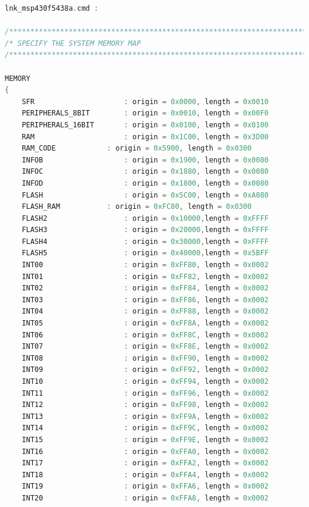 \documentclass[LaM,binding=0.6cm]{../sapthesis}
\begin{document}
\begin{lstlisting}[language=C]
    lnk_msp430f5438a.cmd :
    
/****************************************************************************/
/* SPECIFY THE SYSTEM MEMORY MAP                                            */
/****************************************************************************/

MEMORY
{
    SFR                     : origin = 0x0000, length = 0x0010
    PERIPHERALS_8BIT        : origin = 0x0010, length = 0x00F0
    PERIPHERALS_16BIT       : origin = 0x0100, length = 0x0100
    RAM                     : origin = 0x1C00, length = 0x3D00	
    RAM_CODE		    : origin = 0x5900, length = 0x0300
    INFOB                   : origin = 0x1900, length = 0x0080
    INFOC                   : origin = 0x1880, length = 0x0080
    INFOD                   : origin = 0x1800, length = 0x0080
    FLASH                   : origin = 0x5C00, length = 0xA080	
    FLASH_RAM		    : origin = 0xFC80, length = 0x0300
    FLASH2                  : origin = 0x10000,length = 0xFFFF
    FLASH3                  : origin = 0x20000,length = 0xFFFF
    FLASH4                  : origin = 0x30000,length = 0xFFFF
    FLASH5                  : origin = 0x40000,length = 0x5BFF
    INT00                   : origin = 0xFF80, length = 0x0002
    INT01                   : origin = 0xFF82, length = 0x0002
    INT02                   : origin = 0xFF84, length = 0x0002
    INT03                   : origin = 0xFF86, length = 0x0002
    INT04                   : origin = 0xFF88, length = 0x0002
    INT05                   : origin = 0xFF8A, length = 0x0002
    INT06                   : origin = 0xFF8C, length = 0x0002
    INT07                   : origin = 0xFF8E, length = 0x0002
    INT08                   : origin = 0xFF90, length = 0x0002
    INT09                   : origin = 0xFF92, length = 0x0002
    INT10                   : origin = 0xFF94, length = 0x0002
    INT11                   : origin = 0xFF96, length = 0x0002
    INT12                   : origin = 0xFF98, length = 0x0002
    INT13                   : origin = 0xFF9A, length = 0x0002
    INT14                   : origin = 0xFF9C, length = 0x0002
    INT15                   : origin = 0xFF9E, length = 0x0002
    INT16                   : origin = 0xFFA0, length = 0x0002
    INT17                   : origin = 0xFFA2, length = 0x0002
    INT18                   : origin = 0xFFA4, length = 0x0002
    INT19                   : origin = 0xFFA6, length = 0x0002
    INT20                   : origin = 0xFFA8, length = 0x0002

\end{lstlisting}
\end{document}
